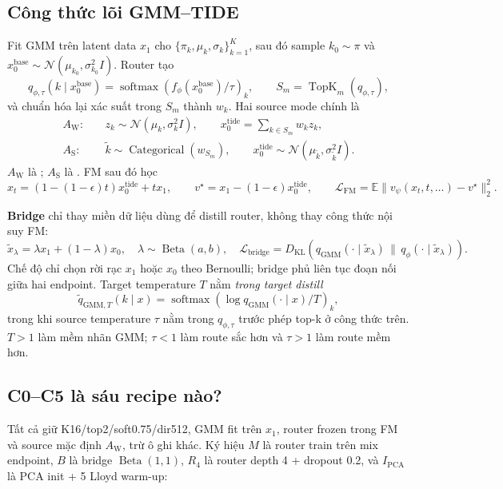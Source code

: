 \documentclass[11pt,a4paper]{article}
\newcommand{\kl}{D_{\mathrm{KL}}}
\newcommand{\metric}[1]{\texttt{\small\detokenize{#1}}}
\begin{document}
\subsection*{Công thức lõi GMM--TIDE}

Fit GMM trên latent data \(x_1\) cho \(\{\pi_k,\mu_k,\sigma_k\}_{k=1}^K\), sau đó sample
\(k_0\sim\pi\) và \(x_0^{\mathrm{base}}\sim\mathcal N(\mu_{k_0},\sigma_{k_0}^2I)\). Router tạo
\[
 q_{\phi,\tau}(k\mid x_0^{\mathrm{base}})
 =\operatorname{softmax}\!\left(f_\phi(x_0^{\mathrm{base}})/\tau\right)_k,
 \qquad S_m=\operatorname{TopK}_m(q_{\phi,\tau}),
\]
và chuẩn hóa lại xác suất trong \(S_m\) thành \(w_k\). Hai source mode chính là
\[
 \begin{aligned}
 A_{\mathrm W}:\quad &z_k\sim\mathcal N(\mu_k,\sigma_k^2I),\qquad
 x_0^{\mathrm{tide}}=\sum_{k\in S_m}w_kz_k,\\
 A_{\mathrm S}:\quad &\tilde k\sim\operatorname{Categorical}(w_{S_m}),\qquad
 x_0^{\mathrm{tide}}\sim\mathcal N(\mu_{\tilde k},\sigma_{\tilde k}^2I).
 \end{aligned}
\]
\(A_{\mathrm W}\) là \metric{weighted}; \(A_{\mathrm S}\) là \metric{sample_topk}. FM sau đó học
\[
 x_t=(1-(1-\epsilon)t)x_0^{\mathrm{tide}}+tx_1,\qquad
 v^\star=x_1-(1-\epsilon)x_0^{\mathrm{tide}},\qquad
 \mathcal L_{\mathrm{FM}}=\mathbb E\|v_\psi(x_t,t,\ldots)-v^\star\|_2^2.
\]

\textbf{Bridge} chỉ thay miền dữ liệu dùng để distill router, không thay công thức nội suy FM:
\[
 \tilde x_\lambda=\lambda x_1+(1-\lambda)x_0,\quad
 \lambda\sim\operatorname{Beta}(a,b),\quad
 \mathcal L_{\mathrm{bridge}}=\kl\!\left(q_{\mathrm{GMM}}(\cdot\mid\tilde x_\lambda)
 \,\|\,q_\phi(\cdot\mid\tilde x_\lambda)\right).
\]
Chế độ \metric{mix} chỉ chọn rời rạc \(x_1\) hoặc \(x_0\) theo Bernoulli; bridge phủ liên tục đoạn nối giữa hai endpoint. Target temperature \(T\) nằm \emph{trong target distill}
\[
 \tilde q_{\mathrm{GMM},T}(k\mid x)
 =\operatorname{softmax}\!\left(\log q_{\mathrm{GMM}}(\cdot\mid x)/T\right)_k,
\]
trong khi source temperature \(\tau\) nằm trong \(q_{\phi,\tau}\) trước phép top-k ở công thức trên. \(T>1\) làm mềm nhãn GMM; \(\tau<1\) làm route sắc hơn và \(\tau>1\) làm route mềm hơn.

\subsection*{C0--C5 là sáu recipe nào?}

Tất cả giữ K16/top2/soft0.75/dir512, GMM fit trên \(x_1\), router frozen trong FM và source mặc định \(A_{\mathrm W}\), trừ ô ghi khác. Ký hiệu \(M\) là router train trên mix endpoint, \(B\) là bridge \(\operatorname{Beta}(1,1)\), \(R_4\) là router depth 4 + dropout 0.2, và \(I_{\mathrm{PCA}}\) là PCA init + 5 Lloyd warm-up:
\end{document}
